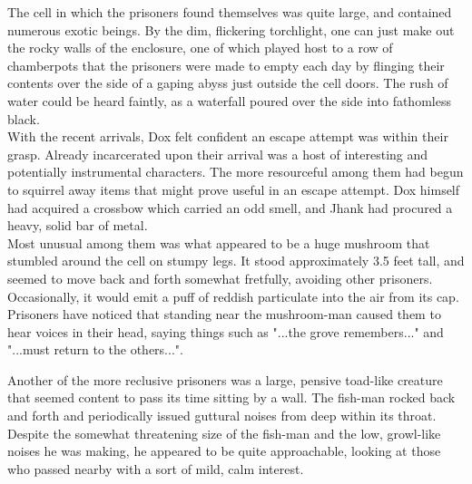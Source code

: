 \documentclass[letterpaper,10pt,twoside,twocolumn,openany]{book}
\begin{document}
The cell in which the prisoners found themselves was quite large, and contained numerous exotic beings. By the dim, flickering torchlight, one can just make out the rocky walls of the enclosure, one of which played host to a row of chamberpots that the prisoners were made to empty each day by flinging their contents over the side of a gaping abyss just outside the cell doors. The rush of water could be heard faintly, as a waterfall poured over the side into fathomless black.\\

With the recent arrivals, Dox felt confident an escape attempt was within their grasp. Already incarcerated upon their arrival was a host of interesting and potentially instrumental characters. The more resourceful among them had begun to squirrel away items that might prove useful in an escape attempt. Dox himself had acquired a crossbow which carried an odd smell, and Jhank had procured a heavy, solid bar of metal.\\

Most unusual among them was what appeared to be a huge mushroom that stumbled around the cell on stumpy legs. It stood approximately 3.5 feet tall, and seemed to move back and forth somewhat fretfully, avoiding other prisoners. Occasionally, it would emit a puff of reddish particulate into the air from its cap. Prisoners have noticed that standing near the mushroom-man caused them to hear voices in their head, saying things such as "...the grove remembers..." and "...must return to the others...".

Another of the more reclusive prisoners was a large, pensive toad-like creature that seemed content to pass its time sitting by a wall. The fish-man rocked back and forth and periodically issued guttural noises from deep within its throat. Despite the somewhat threatening size of the fish-man and the low, growl-like noises he was making, he appeared to be quite approachable, looking at those who passed nearby with a sort of mild, calm interest.\\
\end{document}
